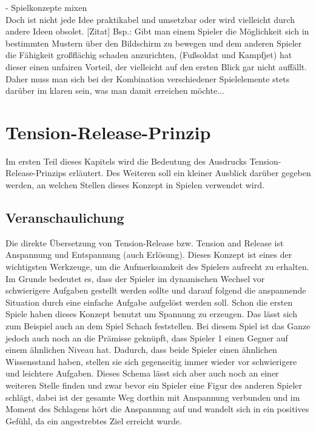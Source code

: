 - Spielkonzepte mixen\\

Doch ist nicht jede Idee praktikabel und umsetzbar oder wird vielleicht durch andere Ideen obsolet. [Zitat] Bsp.: Gibt man einem Spieler die Möglichkeit sich in bestimmten Mustern über den Bildschirm zu bewegen und dem anderen Spieler die Fähigkeit großflächig schaden anzurichten, (Fußsoldat und Kampfjet) hat dieser einen unfairen Vorteil, der vielleicht auf den ersten Blick gar nicht auffällt. Daher muss man sich bei der Kombination verschiedener Spielelemente stets darüber im klaren sein, was man damit erreichen möchte...



\section{Tension-Release-Prinzip}
\label{sec:ext_tr_test}
Im ersten Teil dieses Kapitels wird die Bedeutung des Ausdrucks Tension-Release-Prinzips erläutert. Des Weiteren soll ein kleiner Ausblick darüber gegeben werden, an welchen Stellen dieses Konzept in Spielen verwendet wird.

\subsection{Veranschaulichung} 
Die direkte Übersetzung von Tension-Release bzw. Tension and Release ist Anspannung und Entspannung (auch Erlösung). Dieses Konzept ist eines der wichtigsten Werkzeuge, um die Aufmerksamkeit des Spielers aufrecht zu erhalten. Im Grunde bedeutet es, dass der Spieler im dynamischen Wechsel vor schwierigere Aufgaben gestellt werden sollte und darauf folgend die anspannende Situation durch eine einfache Aufgabe aufgelöst werden soll. 
Schon die ersten Spiele haben dieses Konzept benutzt um Spannung zu erzeugen. Das lässt sich zum Beispiel auch an dem Spiel Schach feststellen. Bei diesem Spiel ist das Ganze jedoch auch noch an die Prämisse geknüpft, dass Spieler 1 einen Gegner auf einem ähnlichen Niveau hat. Dadurch, dass beide Spieler einen ähnlichen Wissensstand haben, stellen sie sich gegenseitig immer wieder vor schwierigere und leichtere Aufgaben. Dieses Schema lässt sich aber auch noch an einer weiteren Stelle finden und zwar bevor ein Spieler eine Figur des anderen Spieler schlägt, dabei ist der gesamte Weg dorthin mit Anspannung verbunden und im  Moment des Schlagens hört die Anspannung auf und wandelt sich in ein positives Gefühl, da ein angestrebtes Ziel erreicht wurde. 

